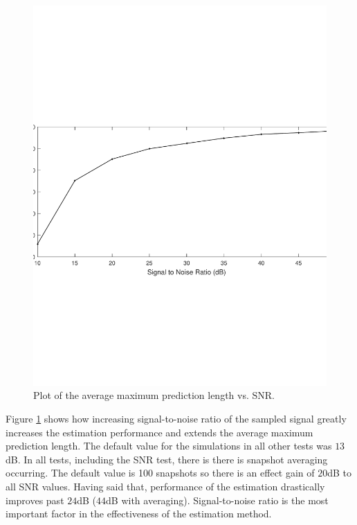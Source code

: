 \documentclass{allertonproc}
\begin{document}
\begin{figure}[tbp]
\begin{center}
\includegraphics[width=6in]{signalToNoise}
\caption{Plot of the average maximum prediction length vs. SNR. }\label{SNR}
\end{center}
\end{figure}
Figure \ref{SNR} shows how increasing signal-to-noise ratio of the sampled signal greatly increases the estimation performance and extends the average maximum prediction length. The default value for the simulations in all other tests was $13$dB. In all tests, including the SNR test, there is there is snapshot averaging occurring. The default value is 100 snapshots so there is an effect gain of $20$dB to all SNR values. Having said that, performance of the estimation drastically improves past $24$dB ($44$dB with averaging). Signal-to-noise ratio is the most important factor in the effectiveness of the estimation method.
\end{document}
